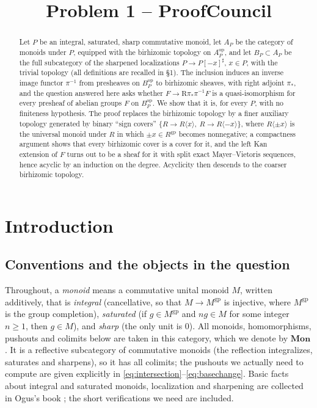 \documentclass[12pt]{article}
\title{Problem 1 -- ProofCouncil}
\author{}
\date{}
\newcommand{\gp}{\mathrm{gp}}
\newcommand{\R}{\mathrm R}
\theoremstyle{definition}
\theoremstyle{remark}
\begin{document}
\maketitle

\begin{abstract}
Let \(P\) be an integral, saturated, sharp commutative monoid, let \(A_P\) be
the category of monoids under \(P\), equipped with the birhizomic topology on
\(A_P^{\mathrm{op}}\), and let \(B_P\subset A_P\) be the full subcategory of
the sharpened localizations \(P\to P[-x]^\sharp\), \(x\in P\), with the
trivial topology (all definitions are recalled in \S1).  The inclusion
induces an inverse image functor \(\pi^{-1}\) from presheaves on
\(B_P^{\mathrm{op}}\) to birhizomic sheaves, with right adjoint \(\pi_*\),
and the question answered here asks whether \(F\to\R\pi_*\pi^{-1}F\) is a
quasi-isomorphism for every presheaf of abelian groups \(F\) on
\(B_P^{\mathrm{op}}\).  We show that it is, for every \(P\), with no
finiteness hypothesis.  The proof replaces the birhizomic topology by a
finer auxiliary topology generated by binary ``sign covers''
\(\{R\to R\langle x\rangle,\ R\to R\langle -x\rangle\}\), where
\(R\langle \pm x\rangle\) is the universal monoid under \(R\) in which
\(\pm x\in R^{\gp}\) becomes nonnegative; a compactness argument shows that
every birhizomic cover is a cover for it, and the left Kan extension of
\(F\) turns out to be a sheaf for it with split exact Mayer--Vietoris
sequences, hence acyclic by an induction on the degree.  Acyclicity then
descends to the coarser birhizomic topology.
\end{abstract}

\section{Introduction}

\subsection{Conventions and the objects in the question}
\label{sec:conventions}

Throughout, a \emph{monoid} means a commutative unital monoid \(M\), written
additively, that is
\emph{integral} (cancellative, so that \(M\to M^{\gp}\) is injective, where
\(M^{\gp}\) is the group completion),
\emph{saturated} (if \(g\in M^{\gp}\) and \(ng\in M\) for some integer
\(n\ge1\), then \(g\in M\)), and
\emph{sharp} (the only unit is \(0\)).
All monoids, homomorphisms, pushouts and colimits below are taken in this
category, which we denote by \(\mathbf{Mon}\).  It is a reflective
subcategory of commutative monoids (the reflection integralizes, saturates
and sharpens), so it has all colimits; the pushouts we actually need to
compute are given explicitly in
\eqref{eq:intersection}--\eqref{eq:basechange}.  Basic facts about
integral and saturated monoids, localization and sharpening are collected in
Ogus's book \cite[Ch.~I, \S\S1.3--1.4]{ogus}; the short verifications we need
are included.
\end{document}
